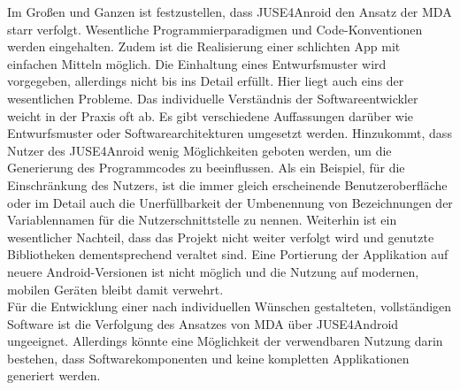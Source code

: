 \documentclass[a4paper,twoside]{article}
\begin{document}
Im Großen und Ganzen ist festzustellen, dass JUSE4Anroid den Ansatz der MDA starr verfolgt. Wesentliche Programmierparadigmen und Code-Konventionen werden eingehalten. Zudem ist die Realisierung einer schlichten App mit einfachen Mitteln möglich. Die Einhaltung eines Entwurfsmuster wird vorgegeben, allerdings nicht bis ins Detail erfüllt. Hier liegt auch eins der wesentlichen Probleme. Das individuelle Verständnis der Softwareentwickler weicht in der Praxis oft ab. Es gibt verschiedene Auffassungen darüber wie Entwurfsmuster oder Softwarearchitekturen umgesetzt werden. Hinzukommt, dass Nutzer des JUSE4Anroid wenig Möglichkeiten geboten werden, um die Generierung des Programmcodes zu beeinflussen. Als ein Beispiel, für die Einschränkung des Nutzers, ist die immer gleich erscheinende Benutzeroberfläche oder im Detail auch die Unerfüllbarkeit der Umbenennung von Bezeichnungen der Variablennamen für die Nutzerschnittstelle zu nennen. Weiterhin ist ein wesentlicher Nachteil, dass das Projekt nicht weiter verfolgt wird und genutzte Bibliotheken dementsprechend veraltet sind. Eine Portierung der Applikation auf neuere Android-Versionen ist nicht möglich und die Nutzung auf modernen, mobilen Geräten bleibt damit verwehrt.
\\

Für die Entwicklung einer nach individuellen Wünschen gestalteten, vollständigen Software ist die Verfolgung des Ansatzes von MDA über JUSE4Android ungeeignet. Allerdings könnte eine Möglichkeit der verwendbaren Nutzung darin bestehen, dass Softwarekomponenten und keine kompletten Applikationen generiert werden.

\vfill

{\small
}
\newpage
\onecolumn
\end{document}
